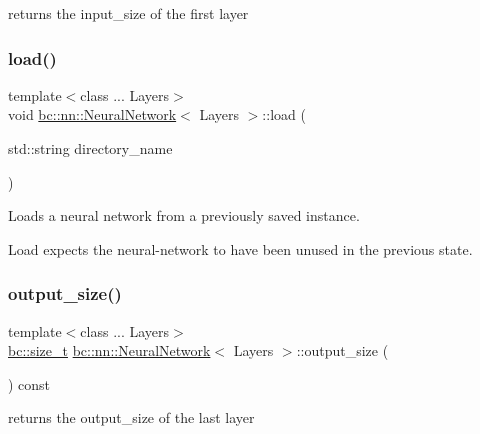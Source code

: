 returns the input\+\_\+size of the first layer 

\mbox{\label{structbc_1_1nn_1_1NeuralNetwork_aa397a644190762a4907668244b46297f}} 
\subsubsection{\texorpdfstring{load()}{load()}}
{\footnotesize\ttfamily template$<$class ... Layers$>$ \\
void \hyperlink{structbc_1_1nn_1_1NeuralNetwork}{bc\+::nn\+::\+Neural\+Network}$<$ Layers $>$\+::load (\begin{DoxyParamCaption}\item[{std\+::string}]{directory\+\_\+name }\end{DoxyParamCaption})\hspace{0.3cm}{\ttfamily [inline]}}



Loads a neural network from a previously saved instance. 

Load expects the neural-\/network to have been unused in the previous state. \mbox{\label{structbc_1_1nn_1_1NeuralNetwork_a3721f03999058b98349a68d4e1a697db}} 
\subsubsection{\texorpdfstring{output\+\_\+size()}{output\_size()}}
{\footnotesize\ttfamily template$<$class ... Layers$>$ \\
\hyperlink{namespacebc_aaf8e3fbf99b04b1b57c4f80c6f55d3c5}{bc\+::size\+\_\+t} \hyperlink{structbc_1_1nn_1_1NeuralNetwork}{bc\+::nn\+::\+Neural\+Network}$<$ Layers $>$\+::output\+\_\+size (\begin{DoxyParamCaption}{ }\end{DoxyParamCaption}) const\hspace{0.3cm}{\ttfamily [inline]}}



returns the output\+\_\+size of the last layer 


